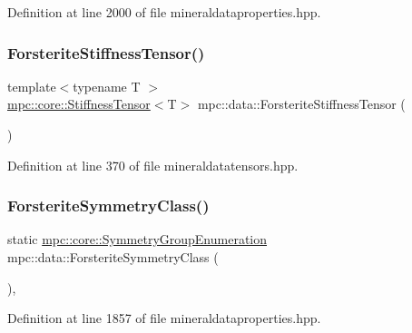 Definition at line 2000 of file mineraldataproperties.\+hpp.

\mbox{\label{namespacempc_1_1data_a4fcc4a43ee16dbdd1fe91ac16fd740ab}} 
\subsubsection{\texorpdfstring{Forsterite\+Stiffness\+Tensor()}{ForsteriteStiffnessTensor()}}
{\footnotesize\ttfamily template$<$typename T $>$ \\
\mbox{\hyperlink{structmpc_1_1core_1_1_stiffness_tensor}{mpc\+::core\+::\+Stiffness\+Tensor}}$<$T$>$ mpc\+::data\+::\+Forsterite\+Stiffness\+Tensor (\begin{DoxyParamCaption}{ }\end{DoxyParamCaption})}



Definition at line 370 of file mineraldatatensors.\+hpp.

\mbox{\label{namespacempc_1_1data_ae594bd328f4890f39d41b33f65eca575}} 
\subsubsection{\texorpdfstring{Forsterite\+Symmetry\+Class()}{ForsteriteSymmetryClass()}}
{\footnotesize\ttfamily static \mbox{\hyperlink{namespacempc_1_1core_a9d979684062547055a0ef5c13077bad8}{mpc\+::core\+::\+Symmetry\+Group\+Enumeration}} mpc\+::data\+::\+Forsterite\+Symmetry\+Class (\begin{DoxyParamCaption}{ }\end{DoxyParamCaption})\hspace{0.3cm}{\ttfamily [inline]}, {\ttfamily [static]}}



Definition at line 1857 of file mineraldataproperties.\+hpp.

\mbox{\label{namespacempc_1_1data_a004f7f9686344460dada6c42a441b761}} 
